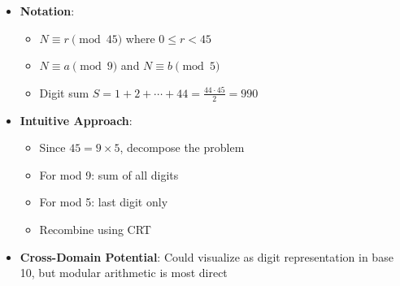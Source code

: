 \documentclass[11pt]{article}
\begin{document}
\begin{problemconfigbox}
\begin{itemize}[leftmargin=*]
    \item \textbf{Notation}: 
    \begin{itemize}
        \item $N \equiv r \pmod{45}$ where $0 \leq r < 45$
        \item $N \equiv a \pmod{9}$ and $N \equiv b \pmod{5}$
        \item Digit sum $S = 1+2+\cdots+44 = \frac{44 \cdot 45}{2} = 990$
    \end{itemize}
    
    \item \textbf{Intuitive Approach}: 
    \begin{itemize}
        \item Since $45 = 9 \times 5$, decompose the problem
        \item For mod 9: sum of all digits
        \item For mod 5: last digit only
        \item Recombine using CRT
    \end{itemize}
    
    \item \textbf{Cross-Domain Potential}: Could visualize as digit representation in base 10, but modular arithmetic is most direct
\end{itemize}
\end{problemconfigbox}
\end{document}
